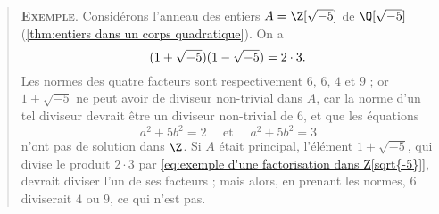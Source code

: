 \documentclass[11pt, %
  title in boldface,
  theorem in new line,
  theorem numbering = section,
  number theorems separately,
  simple name,
]{beaulivre}
\begin{document}
    \begin{quote}
        \textsc{\textbf{Exemple}}.
        Considérons l'anneau des entiers \( A = \Z[\sqrt{-5}] \) de \( \Q[\sqrt{-5}] \) (\cref{thm:entiers dans un corps quadratique}). On a
        \begin{equation}\label{eq:exemple d'une factorisation dans Z[sqrt{-5}]}
            (1+\sqrt{-5})(1-\sqrt{-5}) = 2 \cdot 3.
        \end{equation}
        Les normes des quatre facteurs sont respectivement \( 6 \), \( 6 \), \( 4 \) et \( 9 \) ; or \( 1+\sqrt{-5} \) ne peut avoir de diviseur non-trivial dans \( A \), car la norme d'un tel diviseur devrait être un diviseur non-trivial de \( 6 \), et que les équations
        \[
            a^2 + 5b^2 = 2
            \quad \text{ et } \quad
            a^2 + 5b^2 = 3
        \]
        n'ont pas de solution dans \( \Z \). Si \( A \) était principal, l'élément \( 1+\sqrt{-5} \), qui divise le produit \( 2 \cdot 3 \) par \eqref{eq:exemple d'une factorisation dans Z[sqrt{-5}]}, devrait diviser l'un de ses facteurs ; mais alors, en prenant les normes, \( 6 \) diviserait \( 4 \) ou \( 9 \), ce qui n'est pas.
    \end{quote}
\end{document}

